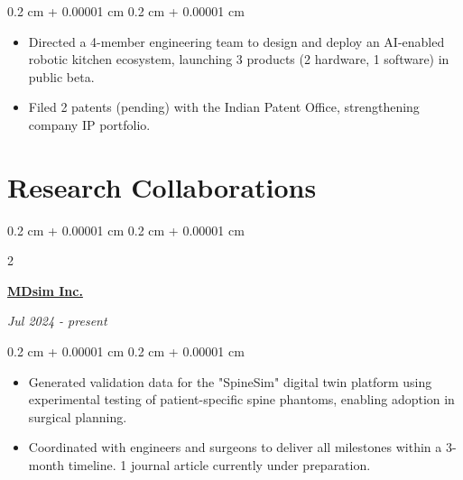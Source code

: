 \documentclass[10pt, letterpaper]{article}
\newenvironment{highlights}{
    \begin{itemize}[
        topsep=0.10 cm,
        parsep=0.10 cm,
        partopsep=0pt,
        itemsep=0pt,
        leftmargin=0.4 cm + 10pt
    ]
}{
    \end{itemize}
} %
\newenvironment{onecolentry}{
    \begin{adjustwidth}{
        0.2 cm + 0.00001 cm
    }{
        0.2 cm + 0.00001 cm
    }
}{
    \end{adjustwidth}
} %
\newenvironment{twocolentry}[2][]{
    \onecolentry
    \def\secondColumn{#2}
    \setcolumnwidth{\fill, 4.5 cm}
    \begin{paracol}{2}
}{
    \switchcolumn \raggedleft \secondColumn
    \end{paracol}
    \endonecolentry
} %
\let\hrefWithoutArrow\href
\renewcommand{\href}[2]{\hrefWithoutArrow{#1}{\ifthenelse{\equal{#2}{}}{ }{#2 }\raisebox{.15ex}{\footnotesize \faExternalLink*}}}
\begin{document}
        \vspace{0.10 cm}
        \begin{onecolentry}
            \begin{highlights}
                \item Directed a 4-member engineering team to design and deploy an AI-enabled robotic kitchen ecosystem, launching 3 products (2 hardware, 1 software) in public beta.

                \item Filed 2 patents (pending) with the Indian Patent Office, strengthening company IP portfolio.
            \end{highlights}
        \end{onecolentry}




     

    
    \section{Research Collaborations}

        \begin{twocolentry}{\textit{Jul 2024 - present}}
            \textbf{\hrefWithoutArrow{https://mdsim.net/}{MDsim Inc.}}
        \end{twocolentry}

        \vspace{0.10 cm}
        \begin{onecolentry}
            \begin{highlights}

             \item Generated validation data for the "SpineSim" digital twin platform using experimental testing of patient-specific spine phantoms, enabling adoption in surgical planning.

            \item Coordinated with engineers and surgeons to deliver all milestones within a 3-month timeline. 1 journal article currently under preparation.
            \end{highlights}
        \end{onecolentry}
\end{document}
